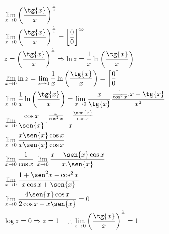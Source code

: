 \begin{ex}
\begin{align}
&\lim_{x\rightarrow 0} \left(\frac{\tg{x}}{x}\right)^{\frac{1}{x}}\nonumber\\
&\lim_{x\rightarrow 0} \left(\frac{\tg{x}}{x}\right)^{\frac{1}{x}}= \left[\frac{0}{0}\right]^{\infty}\nonumber\\
&z=\left(\frac{\tg{x}}{x}\right)^{\frac{1}{x}} \Rightarrow \ln{z}=\frac{1}{x}\ln{\left(\frac{\tg{x}}{x}\right)}\nonumber\\
&\lim_{x\rightarrow 0} \ln{z}=\lim_{x\rightarrow 0} \frac{1}{x} \ln{\left(\frac{\tg{x}}{x}\right)}=\left[\frac{0}{0}\right]\nonumber\\
&\lim_{x\rightarrow 0} \frac{1}{x}\ln{\left(\frac{\tg{x}}{x}\right)}=\lim_{x\rightarrow 0} \frac{x}{\tg{x}} \frac{\frac{1}{\cos^2{x}}.x-\tg{x}}{x^2}\nonumber\\
&\lim_{x\rightarrow 0} \frac{\cos{x}}{\sen{x}}.\frac{\frac{x}{\cos^2{x}}-\frac{\sen{x}}{\cos{x}}}{x}\nonumber\\
&\lim_{x\rightarrow 0} \frac{x\sen{x}\cos{x}}{x\sen{x}\cos{x}}\nonumber\\
&\lim_{x\rightarrow 0} \frac{1}{\cos{x}}.\lim_{x\rightarrow 0} \frac{x-\sen{x}\cos{x}}{x.\sen{x}}\nonumber\\
&\lim_{x\rightarrow 0} \frac{1+\sen^2{x}-\cos^2{x}}{x\cos{x}+\sen{x}}\nonumber\\
&\lim_{x\rightarrow 0} \frac{4\sen{x}\cos{x}}{2\cos{x}-x\sen{x}}=0\nonumber\\
&\log{z}=0 \Rightarrow z=1 \quad \therefore \lim_{x\rightarrow 0} \left(\frac{\tg{x}}{x}\right)^{\frac{1}{x}}=1\nonumber
\end{align}
\end{ex}